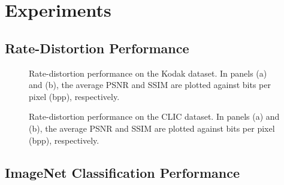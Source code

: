 \section{Experiments} \label{sec: experiments}


\subsection{Rate-Distortion Performance} \label{sec: rate-distortion Performance}



\begin{figure}[t]
	\centering
	\begin{subfigure}{.5\textwidth}
		\centering
		\caption{}
		\label{fig: psnr-vs-bpp kodak}
	\end{subfigure}%
	\begin{subfigure}{.5\textwidth}
		\centering
		\caption{}
		\label{fig: ssim-vs-bpp kodak}
	\end{subfigure}
	\caption{Rate-distortion performance on the Kodak dataset. In panels (a) and (b), the average PSNR and SSIM are plotted against bits per pixel (bpp), respectively.}
	\label{fig: compression performance on kodak}
\end{figure}

\begin{figure}[t]
	\centering
	\begin{subfigure}{.5\textwidth}
		\centering
		\caption{}
		\label{fig: psnr-vs-bpp clic}
	\end{subfigure}%
	\begin{subfigure}{.5\textwidth}
		\centering
		\caption{}
		\label{fig: ssim-vs-bpp clic}
	\end{subfigure}
	\caption{Rate-distortion performance on the CLIC dataset. In panels (a) and (b), the average PSNR and SSIM are plotted against bits per pixel (bpp), respectively.}
	\label{fig: compression performance on clic}
\end{figure}

\subsection{ImageNet Classification Performance} \label{sec: imagenet Classification Performance}


